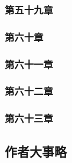 \subsubsection{第五十九章}



\subsubsection{第六十章}



\subsubsection{第六十一章}



\subsubsection{第六十二章}



\subsubsection{第六十三章}



\subsection{作者大事略}








